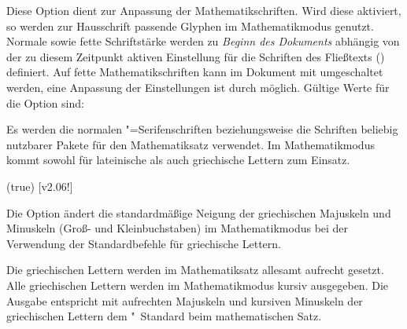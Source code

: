 \begin{DeclareEntity*}{}
\begin{DeclareEntity*}{}
\begin{DeclareEntity*}{}
\begin{Declaration}
Diese Option dient zur Anpassung der Mathematikschriften. Wird diese aktiviert, 
so werden zur Hausschrift passende Glyphen im Mathematikmodus genutzt. Normale 
sowie fette Schriftstärke werden zu \emph{Beginn des Dokuments} abhängig von 
der zu diesem Zeitpunkt aktiven Einstellung für die Schriften des Fließtexts 
() definiert. Auf fette Mathematikschriften kann im 
Dokument mit  umgeschaltet werden, eine Anpassung der 
Einstellungen ist durch  möglich. Gültige Werte für die 
Option  sind:
\begin{DeclareValues}
  Es werden die normalen "=Serifenschriften beziehungsweise die 
  Schriften beliebig nutzbarer Pakete für den Mathematiksatz verwendet.
  Im Mathematikmodus kommt \OpenSans sowohl für lateinische als auch 
  griechische Lettern zum Einsatz.
\end{DeclareValues}
\end{Declaration}

\begin{Declaration}
  {}
  (true)
  [v2.06!]

Die Option ändert die standardmäßige Neigung der griechischen Majuskeln und 
Minuskeln (Groß- und Kleinbuchstaben) im Mathematikmodus bei der Verwendung 
der Standardbefehle für griechische Lettern.
\begin{DeclareValues}
  Die griechischen Lettern werden im Mathematiksatz allesamt aufrecht gesetzt.
  Alle griechischen Lettern werden im Mathematikmodus kursiv ausgegeben.
  Die Ausgabe entspricht mit aufrechten Majuskeln und kursiven Minuskeln der 
  griechischen Lettern dem "~Standard beim mathematischen Satz.
\end{DeclareValues}
\end{Declaration}


\end{DeclareEntity*}
\end{DeclareEntity*}
\end{DeclareEntity*}
